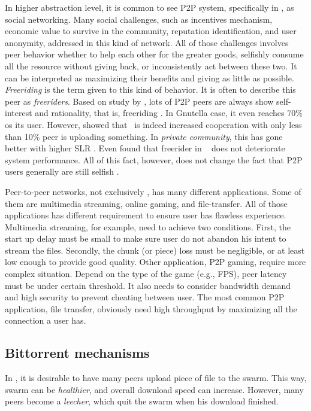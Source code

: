 In higher abstraction level, it is common to see P2P system, specifically in \bt, as social networking. Many social challenges, such as incentives mechanism, economic value to survive in the community, reputation identification, and user anonymity, addressed in this kind of network. All of those challenges involves peer behavior whether to help each other for the greater goods, selfishly consume all the resource without giving back, or inconsistently act between these two. It can be interpreted as maximizing their benefits and giving as little as possible. \textit{Freeriding} is the term given to this kind of behavior. It is often to describe this peer as \textit{freeriders}. Based on study by \citeauthor{2000:freeridegnutella:adar}, lots of P2P peers are always show self-interest and rationality, that is, freeriding \cite{2000:freeridegnutella:adar}. In Gnutella case, it even reaches 70\% os its user.  However, \citeauthor{2005:bittorrentcooperation:andrade} showed that \bt~is indeed increased cooperation with only less than 10\% peer is uploading something. In \textit{private community}, this has gone better with higher SLR \cite{2005:bittorrentcooperation:andrade}. Even \citeauthor{2015:freeriderinbtcommunity:das} found that freerider in \bt~ does not deteriorate system performance\cite{2015:freeriderinbtcommunity:das}. All of this fact, however, does not change the fact that P2P users generally are still selfish \cite{2014:userbehaviourprivate:jia}. 

Peer-to-peer networks, not exclusively \bt, has many different applications. Some of them are multimedia streaming, online gaming, and file-transfer. All of those applications has different requirement to ensure user has flawless experience. Multimedia streaming, for example, need to achieve two conditions. First, the start up delay must be small to make sure user do not abandon his intent to stream the files. Secondly, the chunk (or piece) loss must be negligible, or at least low enough to provide good quality\cite{2008:givetogetvod:Mol}. Other application, P2P gaming, require more complex situation. Depend on the type of the game (e.g., FPS), peer latency must be under certain threshold\cite{2010:surveyp2pgame:shen}. It also needs to consider bandwidth demand and high security to prevent cheating between user. The most common P2P application, file transfer, obviously need high throughput by maximizing all the connection a user has.

\subsection{Bittorrent mechanisms}
In \bt, it is desirable to have many peers upload piece of file to the swarm. This way, swarm can be \textit{healthier}, and overall download speed can increase. However, many peers become a \textit{leecher}, which quit the swarm when his download finished.

